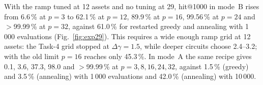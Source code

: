 With the ramp tuned at 12 assets and no tuning at 29, hit@1000 in mode~B rises from 6.6\,\% at $p=3$ to 62.1\,\% at $p=12$, 89.9\,\% at $p=16$, 99.56\,\% at $p=24$ and $>$99.99\,\% at $p=32$, against 61.0\,\% for restarted greedy and annealing with 1\,000 evaluations (Fig.~\ref{fig:exp29}). This requires a wide enough ramp grid at 12 assets: the Task-4 grid stopped at $\Delta\gamma=1.5$, while deeper circuits choose 2.4--3.2; with the old limit $p=16$ reaches only 45.3\,\%. In mode~A the same recipe gives 0.1, 3.6, 37.3, 98.0 and $>$99.99\,\% at $p=3,8,16,24,32$, against 1.5\,\% (greedy) and 3.5\,\% (annealing) with 1\,000 evaluations and 42.0\,\% (annealing) with 10\,000.
